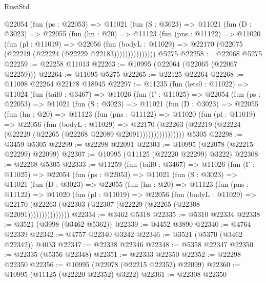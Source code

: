 \begin{lexlean}{RustStd}
\begin{coremodule}
          @22054
            (fun (ps : @22053) =>
            @11021
              (fun (S : @3023) =>
              @11021
                (fun (D : @3023) =>
                @22055
                  (fun (hn : @20) =>
                  @11123
                    (fun (pns : @11122) =>
                    @11020
                      (fun (pl : @11019) =>
                      @22056
                        (fun (bodyL : @11029) =>
                        @22170 (@22075 (@22219 (@22224 (@22229 @22183)))))))))))))))
    @5275
@22258 := @22068 @5275
@22259 := @22258 @11013
@22263 := @10995 (@22064 (@22065 (@22067 @22259)))
@22264 := @11095 @5275
@22265 := @22125 @22264
@22268 := @11098 @22264 @22178 @18945
@22297 := @11235
    (fun (lets0 : @11022) =>
    @11024
      (fun (tail0 : @3467) =>
      @11026
        (fun (Γ : @11025) =>
        @22054
          (fun (ps : @22053) =>
          @11021
            (fun (S : @3023) =>
            @11021
              (fun (D : @3023) =>
              @22055
                (fun (hn : @20) =>
                @11123
                  (fun (pns : @11122) =>
                  @11020
                    (fun (pl : @11019) =>
                    @22056
                      (fun (bodyL : @11029) =>
                      @22170
                        (@22263
                          (@22219 (@22224 (@22229 (@22265 (@22268 @22089 @22091))))))))))))))))
    @5305
@22298 := @3459 @5305
@22299 := @22298 @22091
@22303 := @10995 (@22078 (@22215 @22299) @22099)
@22307 := @10995 (@11125 (@22220 @22299) @3222)
@22308 := @22268 @5305
@22333 := @11259
    (fun (tail0 : @3467) =>
    @11026
      (fun (Γ : @11025) =>
      @22054
        (fun (ps : @22053) =>
        @11021
          (fun (S : @3023) =>
          @11021
            (fun (D : @3023) =>
            @22055
              (fun (hn : @20) =>
              @11123
                (fun (pns : @11122) =>
                @11020
                  (fun (pl : @11019) =>
                  @22056
                    (fun (bodyL : @11029) =>
                    @22170 (@22263 (@22303 (@22307 (@22229 (@22265 (@22308 @22091)))))))))))))))
@22334 := @3462 @5318
@22335 := @5310 @22334
@22338 := @3521 (@3998 (@3462 @5362))
@22339 := @4452 @3890
@22340 := @4764 @22339
@22342 := @4757 @22340 @3242
@22346 := @3521 (@5370 (@3462 @22342)) @4033
@22347 := @22338 @22346
@22348 := @5358 @22347
@22350 := @22335 (@5356 @22348)
@22351 := @22333 @22350
@22352 := @22298 @22350
@22356 := @10995 (@22078 (@22215 @22352) @22099)
@22360 := @10995 (@11125 (@22220 @22352) @3222)
@22361 := @22308 @22350

\end{coremodule}
\end{lexlean}
